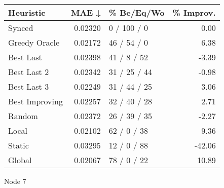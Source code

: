 \begin{tabular}{lrlr}
\toprule
\textbf{Heuristic} & \textbf{MAE ↓} & \textbf{\% Be/Eq/Wo} & \textbf{\% Improv.} \\
\midrule
            Synced &        0.02320 &          0 / 100 / 0 &                0.00 \\
     Greedy Oracle &        0.02172 &          46 / 54 / 0 &                6.38 \\
         Best Last &        0.02398 &          41 / 8 / 52 &               -3.39 \\
       Best Last 2 &        0.02342 &         31 / 25 / 44 &               -0.98 \\
       Best Last 3 &        0.02249 &         31 / 44 / 25 &                3.06 \\
    Best Improving &        0.02257 &         32 / 40 / 28 &                2.71 \\
            Random &        0.02372 &         26 / 39 / 35 &               -2.27 \\
             Local &        0.02102 &          62 / 0 / 38 &                9.36 \\
            Static &        0.03295 &          12 / 0 / 88 &              -42.06 \\
            Global &        0.02067 &          78 / 0 / 22 &               10.89 \\
\bottomrule
\end{tabular}
\caption{Node 7}
\label{tab:non_lr01_le2_bs2_7}
